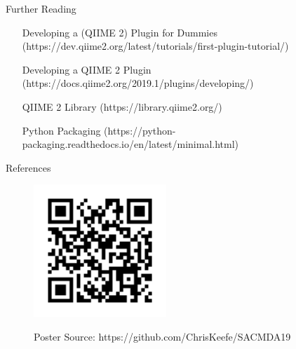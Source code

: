 \documentclass[final]{beamer}
\newlength{\sepwidth}
\newlength{\colwidth}
\newcommand{\separatorcolumn}{\begin{column}{\sepwidth}\end{column}}
\begin{document}
\begin{frame}[t]
\begin{columns}[t]
\begin{column}{\colwidth}
  \begin{block}{Further Reading}
    \begin{itemize}
      \item [Developing a (QIIME 2) Plugin for Dummies](https://dev.qiime2.org/latest/tutorials/first-plugin-tutorial/)
      \item [Developing a QIIME 2 Plugin](https://docs.qiime2.org/2019.1/plugins/developing/)
      \item [QIIME 2 Library](https://library.qiime2.org/)
      \item [Python Packaging](https://python-packaging.readthedocs.io/en/latest/minimal.html)
    \end{itemize}
  \end{block}

  \begin{block}{References}

    \nocite{*}
    

  \end{block}

  \begin{figure}
    \begin{minipage}[c]{\textwidth}
      \hfill
      \includegraphics[height=5cm]{assets/repo}
    \end{minipage}
    \begin{minipage}[c]{\textwidth}
      \hfill
      Poster Source: https://github.com/ChrisKeefe/SACMDA19
    \end{minipage}
\end{figure}


\end{column}

\separatorcolumn
\end{columns}
\end{frame}
\end{document}
